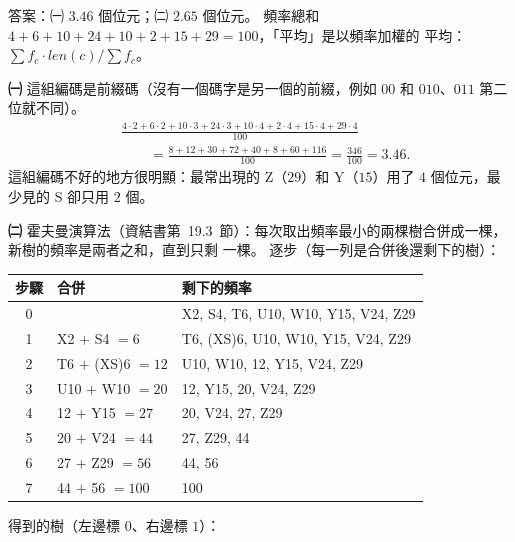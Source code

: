 \begin{pastsoln}
答案：㈠ $3.46$ 個位元；㈡ $2.65$ 個位元。 頻率總和 $4 + 6 + 10 + 24 + 10 + 2 + 15 + 29 = 100$，「平均」是以頻率加權的
平均：$\sum f_c \cdot \mathit{len}(c) / \sum f_c$。

\textbf{㈠} 這組編碼是前綴碼（沒有一個碼字是另一個的前綴，例如 $00$ 和 $010$、$011$ 第二位就不同）。
\begin{align*}
&\frac{4 \cdot 2 + 6 \cdot 2 + 10 \cdot 3 + 24 \cdot 3 + 10 \cdot 4 + 2 \cdot 4 + 15 \cdot 4 + 29 \cdot 4}{100} \\
&\qquad = \frac{8 + 12 + 30 + 72 + 40 + 8 + 60 + 116}{100} = \frac{346}{100} = 3.46 .
\end{align*}
這組編碼不好的地方很明顯：最常出現的 Z（$29$）和 Y（$15$）用了 $4$ 個位元，最少見的 S 卻只用 $2$ 個。

\textbf{㈡} 霍夫曼演算法（資結書第~19.3~節）：每次取出頻率最小的兩棵樹合併成一棵，新樹的頻率是兩者之和，直到只剩
一棵。 逐步（每一列是合併後還剩下的樹）：
\begin{center}
\small
\begin{tabular}{cll}
\toprule
步驟 & 合併 & 剩下的頻率 \\
\midrule
0 & & X2, S4, T6, U10, W10, Y15, V24, Z29 \\
1 & X2 $+$ S4 $= 6$ & T6, (XS)6, U10, W10, Y15, V24, Z29 \\
2 & T6 $+$ (XS)6 $= 12$ & U10, W10, 12, Y15, V24, Z29 \\
3 & U10 $+$ W10 $= 20$ & 12, Y15, 20, V24, Z29 \\
4 & 12 $+$ Y15 $= 27$ & 20, V24, 27, Z29 \\
5 & 20 $+$ V24 $= 44$ & 27, Z29, 44 \\
6 & 27 $+$ Z29 $= 56$ & 44, 56 \\
7 & 44 $+$ 56 $= 100$ & 100 \\
\bottomrule
\end{tabular}
\end{center}
得到的樹（左邊標 $0$、右邊標 $1$）：
\begin{center}
\end{center}
\end{pastsoln}
